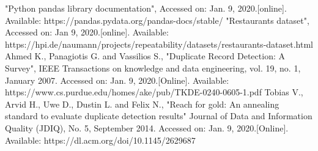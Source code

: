 \documentclass[conference]{IEEEtran}
\begin{document}
\begin{thebibliography}{00}
	 "Python pandas library documentation", Accessed on: Jan. 9, 2020.[online]. Available: https://pandas.pydata.org/pandas-docs/stable/
	 "Restaurants dataset", Accessed on: Jan 9, 2020.[online]. Available: https://hpi.de/naumann/projects/repeatability/datasets/restaurants-dataset.html
	 Ahmed K., Panagiotis G. and Vassilios S., "Duplicate Record Detection: A Survey", IEEE Transactions on knowledge and data engineering, vol. 19, no. 1, January 2007. Accessed on: Jan. 9, 2020.[Online]. Available: https://www.cs.purdue.edu/homes/ake/pub/TKDE-0240-0605-1.pdf
	 Tobias V., Arvid H., Uwe D., Dustin L. and Felix N., "Reach for gold: An annealing standard to evaluate duplicate detection results" Journal of Data and Information Quality (JDIQ), No. 5, September 2014. Accessed on: Jan. 9, 2020.[Online]. Available: https://dl.acm.org/doi/10.1145/2629687
\end{thebibliography}
\end{document}
